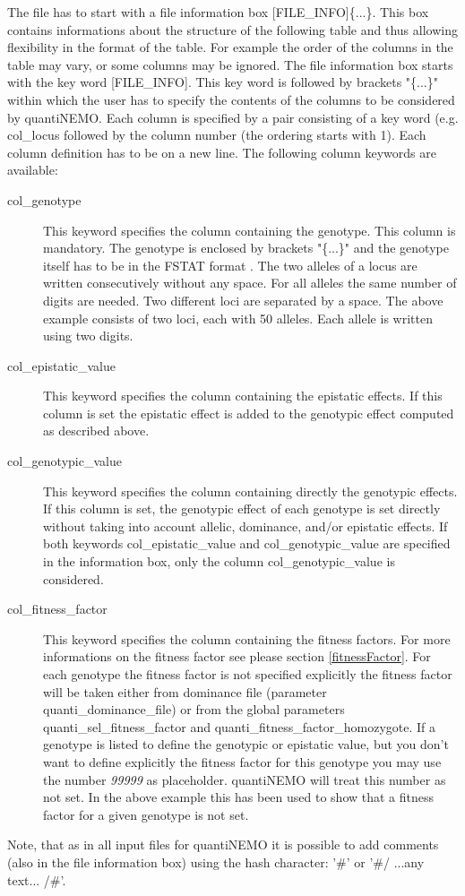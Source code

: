 \documentclass[letterpaper,12pt,oneside]{book}
\begin{document}
\begin{description}
The file has to start with a file information box \textsf{[FILE\_INFO]}\{...\}. 
This box contains informations about the structure of the following table and thus allowing flexibility in the format of the table. For example the order of the columns in the table may vary, or some columns may be ignored. The file information box starts with the key word \textsf{[FILE\_INFO]}. This key word is followed by brackets "\{...\}" within which the user has to specify the contents of the columns to be considered by quantiNEMO. Each column is specified by a pair consisting of a key word (e.g. \textsf{col\_locus} followed by the column number (the ordering starts with 1). Each column definition has to be on a new line. The following column keywords are available:
\begin{description}
\item [col\_genotype] This keyword specifies the column containing the genotype. This column is mandatory. The genotype is enclosed by brackets "\{...\}" and the genotype itself has to be in the FSTAT format \citep{Goudet_1995}. The two alleles of a locus are written consecutively without any space. For all alleles the same number of digits are needed. Two different loci are separated by a space. The above example consists of two loci, each with 50 alleles. Each allele is written using two digits. 
\item [col\_epistatic\_value] This keyword specifies the column containing the epistatic effects. If this column is set the epistatic effect is added to the genotypic effect computed as described above.
\item [col\_genotypic\_value] This keyword specifies the column containing directly the genotypic effects. If this column is set, the genotypic effect of each genotype is set directly without taking into account allelic, dominance, and/or epistatic effects. If both keywords \textsf{col\_epistatic\_value} and \textsf{col\_genotypic\_value} are specified in the information box, only the column \textsf{col\_genotypic\_value} is considered. 
\item [col\_fitness\_factor] This keyword specifies the column containing the fitness factors. For more informations on the fitness factor see please section \ref{fitnessFactor}. For each genotype the fitness factor is not specified explicitly the fitness factor will be taken either from dominance file (parameter \textsf{quanti\_dominance\_file}) or from the global parameters \textsf{quanti\_sel\_fitness\_factor} and \textsf{quanti\_fitness\_factor\_homozygote}. If a genotype is listed to define the genotypic or epistatic value, but you don't want to define explicitly the fitness factor for this genotype you may use the number \textit{99999} as placeholder. quantiNEMO will treat this number as not set. In the above example this has been used to show that a fitness factor for a given genotype is not set.
\end{description} 
Note, that as in all input files for quantiNEMO it is possible to add comments (also in the file information box) using the hash character: '\#' or '\#/ ...any text... /\#'.


\end{description}
\end{document}
